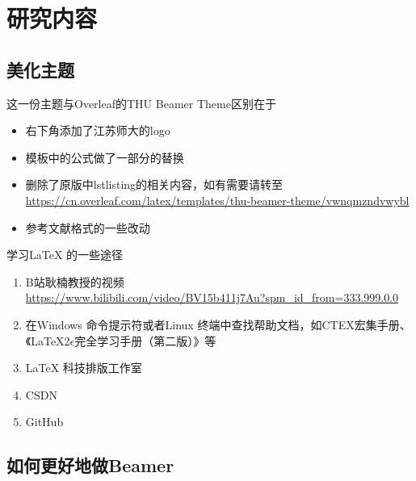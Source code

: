 \documentclass{beamer}
\begin{document}
	\section{研究内容}
	    \subsection{美化主题}
	
	\begin{frame}{这一份主题与Overleaf的THU Beamer Theme区别在于}
		\begin{itemize}[<+->]
			\item 右下角添加了江苏师大的logo
			\item 模板中的公式做了一部分的替换
			\item 删除了原版中lstlisting的相关内容，如有需要请转至 \\
			\url{https://cn.overleaf.com/latex/templates/thu-beamer-theme/vwnqmzndvwybl}
			\item 参考文献格式的一些改动
		\end{itemize}
	\end{frame}
		
	\begin{frame}{学习\LaTeX{} 的一些途径}
		\begin{enumerate}[<+->]
			\item  B站耿楠教授的视频 \\ \url{https://www.bilibili.com/video/BV15b411j7Au?spm_id_from=333.999.0.0}
			\item  在Windows 命令提示符或者Linux 终端中查找帮助文档，如CTEX宏集手册、《LaTeX2$\epsilon$完全学习手册（第二版）》等
			\item  \LaTeX{} 科技排版工作室 
			\item  CSDN
			\item  GitHub
		\end{enumerate}
	\end{frame}
	
	\subsection{如何更好地做Beamer}
	
\end{document}
